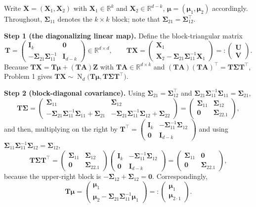 \documentclass{MFM-hw} %
\newcommand{\real}{\mathbb{R}}
\newcommand{\normal}{\operatorname{N}}
\newcommand{\bX}{\bm{X}}
\newcommand{\bZ}{\bm{Z}}
\newcommand{\bA}{\bm{A}}
\newcommand{\bI}{\bm{I}}
\newcommand{\bT}{\bm{T}}
\newcommand{\bU}{\bm{U}}
\newcommand{\bV}{\bm{V}}
\newcommand{\bmu}{\bm{\mu}}
\newcommand{\bSigma}{\bm{\Sigma}}
\newcommand{\bzero}{\bm{0}}
\begin{document}
Write $\bX=(\bX_1,\bX_2)$ with $\bX_1\in\real^k$ and $\bX_2\in\real^{d-k}$, $\bmu=(\bmu_1,\bmu_2)$ accordingly. Throughout, $\bSigma_{11}$ denotes the $k\times k$ block; note that $\bSigma_{21}=\bSigma_{12}^\top$.

\smallskip
\noindent\textbf{Step 1 (the diagonalizing linear map).} Define the block-triangular matrix
\[
    \bT=\begin{pmatrix}\bI_k&\bzero\\ -\bSigma_{21}\bSigma_{11}^{-1}&\bI_{d-k}\end{pmatrix}\in\real^{d\times d},
    \qquad
    \bT\bX=\begin{pmatrix}\bX_1\\ \bX_2-\bSigma_{21}\bSigma_{11}^{-1}\bX_1\end{pmatrix}=:\begin{pmatrix}\bU\\ \bV\end{pmatrix}.
\]
Because $\bT\bX=\bT\bmu+(\bT\bA)\bZ$ with $\bT\bA\in\real^{d\times k}$ and $(\bT\bA)(\bT\bA)^\top=\bT\bSigma\bT^\top$, Problem 1 gives $\bT\bX\sim\normal_d\bigl(\bT\bmu,\bT\bSigma\bT^\top\bigr)$.

\smallskip
\noindent\textbf{Step 2 (block-diagonal covariance).} Using $\bSigma_{21}=\bSigma_{12}^\top$ and $\bSigma_{21}\bSigma_{11}^{-1}\bSigma_{11}=\bSigma_{21}$,
\[
    \bT\bSigma=\begin{pmatrix}\bSigma_{11}&\bSigma_{12}\\ -\bSigma_{21}\bSigma_{11}^{-1}\bSigma_{11}+\bSigma_{21}&-\bSigma_{21}\bSigma_{11}^{-1}\bSigma_{12}+\bSigma_{22}\end{pmatrix}
    =\begin{pmatrix}\bSigma_{11}&\bSigma_{12}\\ \bzero&\bSigma_{22.1}\end{pmatrix},
\]
and then, multiplying on the right by $\bT^\top=\begin{pmatrix}\bI_k&-\bSigma_{11}^{-1}\bSigma_{12}\\ \bzero&\bI_{d-k}\end{pmatrix}$ and using $\bSigma_{11}\bSigma_{11}^{-1}\bSigma_{12}=\bSigma_{12}$,
\[
    \bT\bSigma\bT^\top
    =\begin{pmatrix}\bSigma_{11}&\bSigma_{12}\\ \bzero&\bSigma_{22.1}\end{pmatrix}
     \begin{pmatrix}\bI_k&-\bSigma_{11}^{-1}\bSigma_{12}\\ \bzero&\bI_{d-k}\end{pmatrix}
    =\begin{pmatrix}\bSigma_{11}&\bzero\\ \bzero&\bSigma_{22.1}\end{pmatrix},
\]
because the upper-right block is $-\bSigma_{12}+\bSigma_{12}=\bzero$. Correspondingly,
\[
    \bT\bmu=\begin{pmatrix}\bmu_1\\ \bmu_2-\bSigma_{21}\bSigma_{11}^{-1}\bmu_1\end{pmatrix}=:\begin{pmatrix}\bmu_1\\ \bmu_{2\cdot1}\end{pmatrix} .
\]
\end{document}
